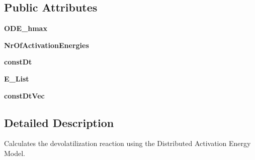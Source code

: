 \subsection*{\-Public \-Attributes}
\begin{DoxyCompactItemize}
\item 
\hypertarget{classModels_1_1DAEM_aec08a04e258d654483d9a5dc8d999ab9}{{\bfseries \-O\-D\-E\-\_\-hmax}}\label{classModels_1_1DAEM_aec08a04e258d654483d9a5dc8d999ab9}

\item 
\hypertarget{classModels_1_1DAEM_a4a4677dd5d017d4ef8803d98a067f0ba}{{\bfseries \-Nr\-Of\-Activation\-Energies}}\label{classModels_1_1DAEM_a4a4677dd5d017d4ef8803d98a067f0ba}

\item 
\hypertarget{classModels_1_1DAEM_a63861d8311d112cfd894639960c589da}{{\bfseries const\-Dt}}\label{classModels_1_1DAEM_a63861d8311d112cfd894639960c589da}

\item 
\hypertarget{classModels_1_1DAEM_af93597d730ec6e6a12828598f42f06bc}{{\bfseries \-E\-\_\-\-List}}\label{classModels_1_1DAEM_af93597d730ec6e6a12828598f42f06bc}

\item 
\hypertarget{classModels_1_1Model_a3f71983de5f8b86bec47929213b900ec}{{\bfseries const\-Dt\-Vec}}\label{classModels_1_1Model_a3f71983de5f8b86bec47929213b900ec}

\end{DoxyCompactItemize}


\subsection{\-Detailed \-Description}
\begin{DoxyVerb}Calculates the devolatilization reaction using the Distributed Activation Energy Model.\end{DoxyVerb}
 

